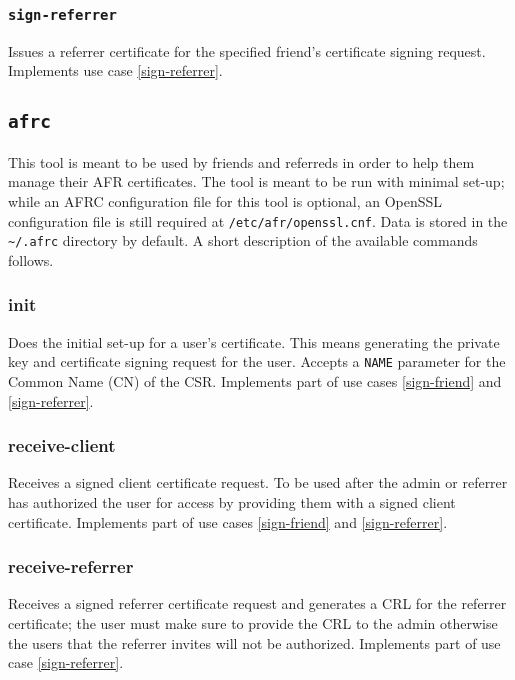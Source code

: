\documentclass{article}
\begin{document}
\subsubsection{\texttt{sign-referrer}}
Issues a referrer certificate for the specified friend's certificate signing request.  Implements use case \ref{sign-referrer}.

\subsection{\texttt{afrc}}

This tool is meant to be used by friends and referreds in order to help them manage their AFR certificates.  The tool is meant to be run with minimal set-up; while an AFRC configuration file for this tool is optional, an OpenSSL configuration file is still required at \texttt{/etc/afr/openssl.cnf}.  Data is stored in the \texttt{\textasciitilde /.afrc} directory by default.  A short description of the available commands follows.

\subsubsection{init}

Does the initial set-up for a user's certificate.  This means generating the private key and certificate signing request for the user.  Accepts a \texttt{NAME} parameter for the Common Name (CN) of the CSR.  Implements part of use cases \ref{sign-friend} and \ref{sign-referrer}.

\subsubsection{receive-client}

Receives a signed client certificate request.  To be used after the admin or referrer has authorized the user for access by providing them with a signed client certificate.  Implements part of use cases \ref{sign-friend} and \ref{sign-referrer}.

\subsubsection{receive-referrer}

Receives a signed referrer certificate request and generates a CRL for the referrer certificate; the user must make sure to provide the CRL to the admin otherwise the users that the referrer invites will not be authorized.  Implements part of use case \ref{sign-referrer}.
\end{document}
